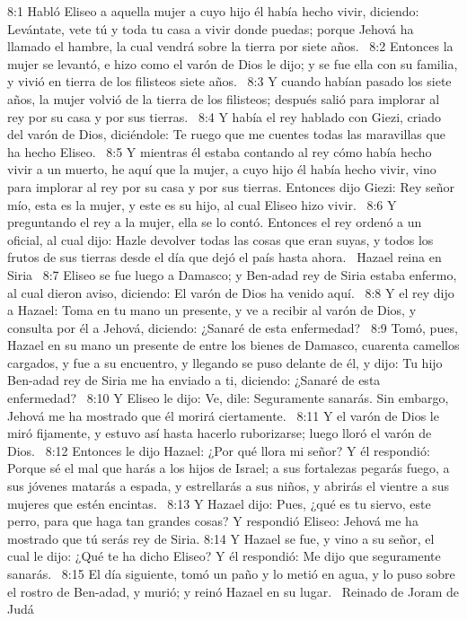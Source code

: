 8:1 Habló Eliseo a aquella mujer a cuyo hijo él había hecho vivir, diciendo: Levántate, vete tú y toda tu casa a vivir donde puedas; porque Jehová ha llamado el hambre, la cual vendrá sobre la tierra por siete años.  
8:2 Entonces la mujer se levantó, e hizo como el varón de Dios le dijo; y se fue ella con su familia, y vivió en tierra de los filisteos siete años.  
8:3 Y cuando habían pasado los siete años, la mujer volvió de la tierra de los filisteos; después salió para implorar al rey por su casa y por sus tierras.  
8:4 Y había el rey hablado con Giezi, criado del varón de Dios, diciéndole: Te ruego que me cuentes todas las maravillas que ha hecho Eliseo.  
8:5 Y mientras él estaba contando al rey cómo había hecho vivir a un muerto, he aquí que la mujer, a cuyo hijo él había hecho vivir, vino para implorar al rey por su casa y por sus tierras. Entonces dijo Giezi: Rey señor mío, esta es la mujer, y este es su hijo, al cual Eliseo hizo vivir.  
8:6 Y preguntando el rey a la mujer, ella se lo contó. Entonces el rey ordenó a un oficial, al cual dijo: Hazle devolver todas las cosas que eran suyas, y todos los frutos de sus tierras desde el día que dejó el país hasta ahora.  
Hazael reina en Siria  
8:7 Eliseo se fue luego a Damasco; y Ben-adad rey de Siria estaba enfermo, al cual dieron aviso, diciendo: El varón de Dios ha venido aquí.  
8:8 Y el rey dijo a Hazael: Toma en tu mano un presente, y ve a recibir al varón de Dios, y consulta por él a Jehová, diciendo: ¿Sanaré de esta enfermedad?  
8:9 Tomó, pues, Hazael en su mano un presente de entre los bienes de Damasco, cuarenta camellos cargados, y fue a su encuentro, y llegando se puso delante de él, y dijo: Tu hijo Ben-adad rey de Siria me ha enviado a ti, diciendo: ¿Sanaré de esta enfermedad?  
8:10 Y Eliseo le dijo: Ve, dile: Seguramente sanarás. Sin embargo, Jehová me ha mostrado que él morirá ciertamente.  
8:11 Y el varón de Dios le miró fijamente, y estuvo así hasta hacerlo ruborizarse; luego lloró el varón de Dios.  
8:12 Entonces le dijo Hazael: ¿Por qué llora mi señor? Y él respondió: Porque sé el mal que harás a los hijos de Israel; a sus fortalezas pegarás fuego, a sus jóvenes matarás a espada, y estrellarás a sus niños, y abrirás el vientre a sus mujeres que estén encintas.  
8:13 Y Hazael dijo: Pues, ¿qué es tu siervo, este perro, para que haga tan grandes cosas? Y respondió Eliseo: Jehová me ha mostrado que tú serás rey de Siria. 
8:14 Y Hazael se fue, y vino a su señor, el cual le dijo: ¿Qué te ha dicho Eliseo? Y él respondió: Me dijo que seguramente sanarás.  
8:15 El día siguiente, tomó un paño y lo metió en agua, y lo puso sobre el rostro de Ben-adad, y murió; y reinó Hazael en su lugar.  
Reinado de Joram de Judá  

